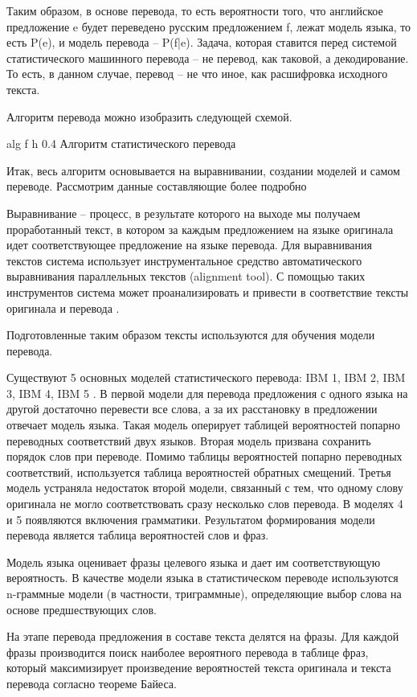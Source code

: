 Таким образом, в основе перевода, то есть вероятности того, что
английское предложение e будет переведено русским предложением f, лежат
модель языка, то есть P(e), и модель перевода – P(f|e). Задача, которая
ставится перед системой статистического машинного перевода – не перевод,
как таковой, а декодирование. То есть, в данном случае, перевод – не что
иное, как расшифровка исходного текста. 

Алгоритм перевода можно изобразить следующей схемой.

{alg} %
{f} %
{h} %
{0.4\textwidth} %
{Алгоритм статистического перевода \cite{smt2}} %


\clearpage

Итак, весь алгоритм основывается на выравнивании, создании моделей
и самом переводе. Рассмотрим данные составляющие более подробно

Выравнивание – процесс, в результате которого на выходе мы
получаем проработанный текст, в котором за каждым предложением на
языке оригинала идет соответствующее предложение на языке перевода. Для выравнивания текстов система использует инструментальное средство
автоматического выравнивания параллельных текстов (alignment tool). С
помощью таких инструментов система может проанализировать и привести в
соответствие тексты оригинала и перевода \cite{smt2}. 

Подготовленные таким образом тексты используются для обучения модели перевода.

Существуют 5 основных моделей статистического перевода: IBM 1, IBM 2, IBM 3, IBM 4, IBM 5 \cite{smt}. В первой модели для перевода предложения с одного языка на другой достаточно перевести все слова, а за их расстановку в предложении отвечает модель языка. Такая модель оперирует таблицей вероятностей попарно переводных соответствий двух языков. Вторая модель призвана сохранить порядок слов при переводе. Помимо таблицы вероятностей попарно переводных соответствий, используется таблица вероятностей обратных смещений. Третья модель устраняла недостаток второй модели, связанный с тем, что одному слову оригинала не могло соответствовать сразу несколько слов перевода. В моделях 4 и 5 появляются включения грамматики. Результатом формирования модели перевода является таблица вероятностей слов и фраз. 

Модель языка оценивает фразы целевого языка и дает им соответствующую вероятность. В качестве модели языка в статистическом переводе используются n-граммные модели (в частности, триграммные), определяющие выбор слова на основе предшествующих слов.

На этапе перевода предложения в составе текста делятся на фразы. Для каждой фразы производится поиск наиболее вероятного перевода в таблице фраз, который максимизирует произведение вероятностей текста оригинала и текста перевода согласно теореме Байеса. 
